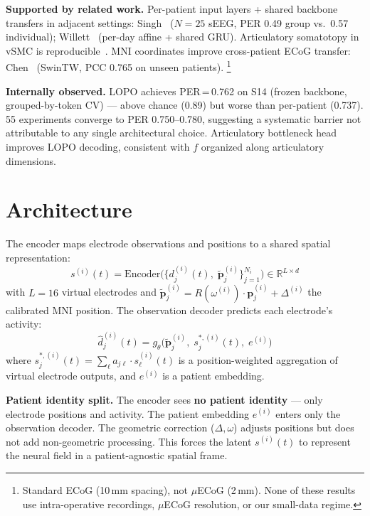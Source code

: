 \documentclass[11pt,letterpaper]{article}
\newcommand{\bfp}{\mathbf{p}}
\newcommand{\R}{\mathbb{R}}
\begin{document}
\textbf{Supported by related work.}
Per-patient input layers + shared backbone transfers in adjacent settings: Singh~\cite{singh2025} ($N{=}25$ sEEG, PER 0.49 group vs.\ 0.57 individual); Willett~\cite{willett2023} (per-day affine + shared GRU).
Articulatory somatotopy in vSMC is reproducible~\cite{metzger2023,bouchard2013}.
MNI coordinates improve cross-patient ECoG transfer: Chen~\cite{chen2025} (SwinTW, PCC 0.765 on unseen patients).%
\footnote{Standard ECoG (10\,mm spacing), not $\mu$ECoG (2\,mm). None of these results use intra-operative recordings, $\mu$ECoG resolution, or our small-data regime.}

\textbf{Internally observed.}
LOPO achieves PER\,=\,0.762 on S14 (frozen backbone, grouped-by-token CV) --- above chance (0.89) but worse than per-patient (0.737).
55 experiments converge to PER 0.750--0.780, suggesting a systematic barrier not attributable to any single architectural choice.
Articulatory bottleneck head improves LOPO decoding, consistent with $f$ organized along articulatory dimensions.



\section{Architecture}\label{sec:architecture}

The encoder maps electrode observations and positions to a shared spatial representation:
\begin{equation}\label{eq:encoder}
s^{(i)}(t) = \text{Encoder}\bigl(\{d_j^{(i)}(t),\; \tilde{\bfp}_j^{(i)}\}_{j=1}^{N_i}\bigr) \in \R^{L \times d}
\end{equation}
with $L{=}16$ virtual electrodes and $\tilde{\bfp}_j^{(i)} = R(\omega^{(i)}) \cdot \bfp_j^{(i)} + \Delta^{(i)}$ the calibrated MNI position. The observation decoder predicts each electrode's activity:
\begin{equation}\label{eq:implemented}
\boxed{\hat{d}_j^{(i)}(t) = g_\theta\bigl(\tilde{\bfp}_j^{(i)},\; s_j^{*,(i)}(t),\; e^{(i)}\bigr)}
\end{equation}
where $s_j^{*,(i)}(t) = \sum_\ell a_{j\ell} \cdot s_\ell^{(i)}(t)$ is a position-weighted aggregation of virtual electrode outputs, and $e^{(i)}$ is a patient embedding.

\textbf{Patient identity split.} The encoder sees \textbf{no patient identity} --- only electrode positions and activity. The patient embedding $e^{(i)}$ enters only the observation decoder. The geometric correction ($\Delta, \omega$) adjusts positions but does not add non-geometric processing. This forces the latent $s^{(i)}(t)$ to represent the neural field in a patient-agnostic spatial frame.
\end{document}
